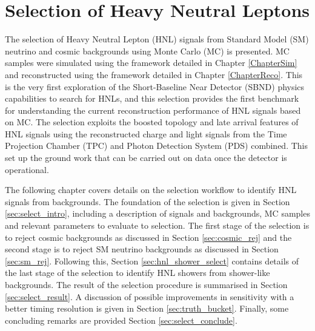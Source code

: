 \chapter{Selection of Heavy Neutral Leptons}
\label{ChapterSelect}

\ifpdf
    \graphicspath{{Chapter9/Figs/Raster/}{Chapter9/Figs/PDF/}{Chapter9/Figs/}}
\else
    \graphicspath{{Chapter9/Figs/Vector/}{Chapter9/Figs/}}
\fi


The selection of Heavy Neutral Lepton (HNL) signals from Standard Model (SM) neutrino and cosmic backgrounds using Monte Carlo (MC) is presented.  
MC samples were simulated using the framework detailed in Chapter \ref{ChapterSim} and reconstructed using the framework detailed in Chapter \ref{ChapterReco}.
This is the very first exploration of the Short-Baseline Near Detector (SBND) physics capabilities to search for HNLs, and this selection provides the first benchmark for understanding the current reconstruction performance of HNL signals based on MC.
The selection exploits the boosted topology and late arrival features of HNL signals using the reconstructed charge and light signals from the Time Projection Chamber (TPC) and Photon Detection System (PDS) combined.
This set up the ground work that can be carried out on data once the detector is operational.

The following chapter covers details on the selection workflow to identify HNL signals from backgrounds.
The foundation of the selection is given in Section \ref{sec:select_intro}, including a description of signals and backgrounds, MC samples and relevant parameters to evaluate to selection.
The first stage of the selection is to reject cosmic backgrounds as discussed in Section \ref{sec:cosmic_rej} and the second stage is to reject SM neutrino backgrounds as discussed in Section \ref{sec:sm_rej}.
Following this, Section \ref{sec:hnl_shower_select} contains details of the last stage of the selection to identify HNL showers from shower-like backgrounds.
The result of the selection procedure is summarised in Section \ref{sec:select_result}.
A discussion of possible improvements in sensitivity with a better timing resolution is given in Section \ref{sec:truth_bucket}.
Finally, some concluding remarks are provided Section \ref{sec:select_conclude}.

